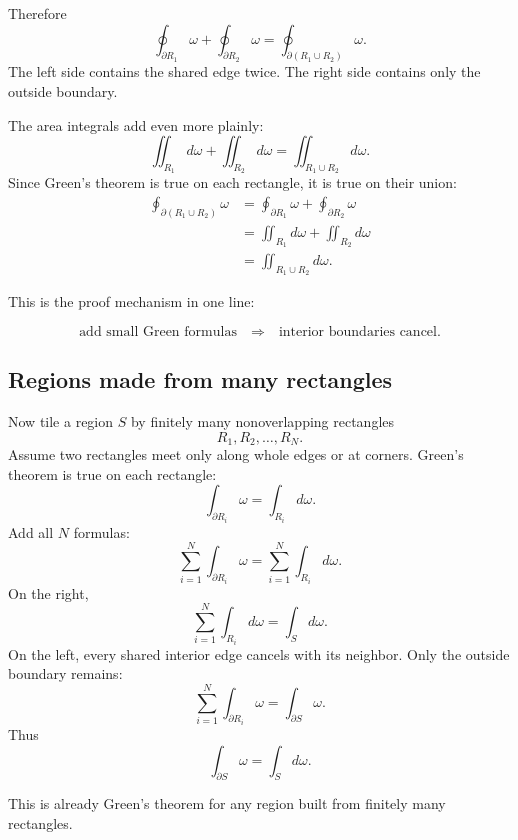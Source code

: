 Therefore
\[
\boxed{
    \oint_{\partial R_1}\omega+\oint_{\partial R_2}\omega
    =
    \oint_{\partial(R_1\cup R_2)}\omega.
}
\]
The left side contains the shared edge twice.  The right side contains only the outside
boundary.

The area integrals add even more plainly:
\[
    \iint_{R_1}d\omega+\iint_{R_2}d\omega
    =
    \iint_{R_1\cup R_2}d\omega.
\]
Since Green's theorem is true on each rectangle, it is true on their union:
\[
\begin{aligned}
    \oint_{\partial(R_1\cup R_2)}\omega
    &=
    \oint_{\partial R_1}\omega+\oint_{\partial R_2}\omega\\
    &=
    \iint_{R_1}d\omega+\iint_{R_2}d\omega\\
    &=
    \iint_{R_1\cup R_2}d\omega.
\end{aligned}
\]

This is the proof mechanism in one line:

\[
\boxed{
    \text{add small Green formulas}
    \quad\Longrightarrow\quad
    \text{interior boundaries cancel.}
}
\]

\subsection{Regions made from many rectangles}

Now tile a region \(S\) by finitely many nonoverlapping rectangles
\[
    R_1,R_2,\ldots,R_N.
\]
Assume two rectangles meet only along whole edges or at corners.  Green's theorem is
true on each rectangle:
\[
    \int_{\partial R_i}\omega=\int_{R_i}d\omega.
\]
Add all \(N\) formulas:
\[
    \sum_{i=1}^N\int_{\partial R_i}\omega
    =
    \sum_{i=1}^N\int_{R_i}d\omega.
\]
On the right,
\[
    \sum_{i=1}^N\int_{R_i}d\omega
    =
    \int_S d\omega.
\]
On the left, every shared interior edge cancels with its neighbor.  Only the outside
boundary remains:
\[
    \sum_{i=1}^N\int_{\partial R_i}\omega
    =
    \int_{\partial S}\omega.
\]
Thus
\[
\boxed{
    \int_{\partial S}\omega=\int_S d\omega.
}
\]

This is already Green's theorem for any region built from finitely many rectangles.

